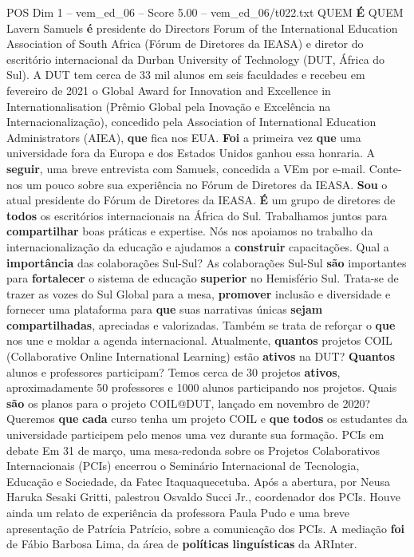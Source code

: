 \begin{textsample}{POS Dim 1 – vem\_ed\_06 – Score 5.00 – vem\_ed\_06/t022.txt}  \label{ex:f1_pos_130}
QUEM \textbf{É} QUEM Lavern Samuels \textbf{é} presidente do Directors Forum of the International Education Association of South Africa (Fórum de Diretores da IEASA) e diretor do escritório internacional da Durban University of Technology (DUT, África do Sul).
A DUT tem cerca de 33 mil alunos em seis faculdades e recebeu em fevereiro de 2021 o Global Award for Innovation and Excellence in Internationalisation (Prêmio Global pela Inovação e Excelência na Internacionalização), concedido pela Association of International Education Administrators (AIEA), \textbf{que} fica nos EUA. \textbf{Foi} a primeira vez \textbf{que} uma universidade fora da Europa e dos Estados Unidos ganhou essa honraria.
A \textbf{seguir}, uma breve entrevista com Samuels, concedida a VEm por e-mail.
Conte-nos um pouco sobre sua experiência no Fórum de Diretores da IEASA. \textbf{Sou} o atual presidente do Fórum de Diretores da IEASA. \textbf{É} um grupo de diretores de \textbf{todos} os escritórios internacionais na África do Sul.
Trabalhamos juntos para \textbf{compartilhar} boas práticas e expertise.
Nós nos apoiamos no trabalho da internacionalização da educação e ajudamos a \textbf{construir} capacitações.
Qual a \textbf{importância} das colaborações Sul-Sul?
As colaborações Sul-Sul \textbf{são} importantes para \textbf{fortalecer} o sistema de educação \textbf{superior} no Hemisfério Sul.
Trata-se de trazer as vozes do Sul Global para a mesa, \textbf{promover} inclusão e diversidade e fornecer uma plataforma para \textbf{que} suas narrativas únicas \textbf{sejam} \textbf{compartilhadas}, apreciadas e valorizadas.
Também se trata de reforçar o \textbf{que} nos une e moldar a agenda internacional.
Atualmente, \textbf{quantos} projetos COIL (Collaborative Online International Learning) estão \textbf{ativos} na DUT? \textbf{Quantos} alunos e professores participam?
Temos cerca de 30 projetos \textbf{ativos}, aproximadamente 50 professores e 1000 alunos participando nos projetos.
Quais \textbf{são} os planos para o projeto COIL@DUT, lançado em novembro de 2020?
Queremos \textbf{que} \textbf{cada} curso tenha um projeto COIL e \textbf{que} \textbf{todos} os estudantes da universidade participem pelo menos uma vez durante sua formação.
PCIs em debate Em 31 de março, uma mesa-redonda sobre os Projetos Colaborativos Internacionais (PCIs) encerrou o Seminário Internacional de Tecnologia, Educação e Sociedade, da Fatec Itaquaquecetuba.
Após a abertura, por Neusa Haruka Sesaki Gritti, palestrou Osvaldo Succi Jr., coordenador dos PCIs.
Houve ainda um relato de experiência da professora Paula Pudo e uma breve apresentação de Patrícia Patrício, sobre a comunicação dos PCIs.
A mediação \textbf{foi} de Fábio Barbosa Lima, da área de \textbf{políticas} \textbf{linguísticas} da ARInter.

\end{textsample}

